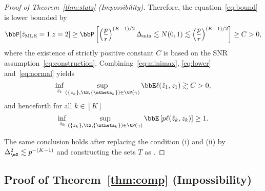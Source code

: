 \documentclass[lettersize,onecolumn,journal]{IEEEtran}
\theoremstyle{definition}
\theoremstyle{definition}
\begin{document}
\begin{proof}[Proof of Theorem~\ref{thm:stats} (Impossibility)]
Therefore, the equation~\eqref{eq:bound} is lower bounded by
\begin{equation}\label{eq:normal}
\bbP[\hat z_{\text{MLE}}=1|z=2] \geq \bbP\left[ \left({p\over r}\right)^{(K-1)/2}\Delta_{\min}\lesssim N(0,1)\lesssim  \left({p\over r}\right)^{(K-1)/2} \right]\geq C>0,
\end{equation}
 where the existence of strictly positive constant $C$ is based on the SNR assumption~\eqref{eq:construction}. Combining~\eqref{eq:minimax}, \eqref{eq:lower} and~\eqref{eq:normal} yields
\[
\inf_{\hat z_1}\sup_{(\{z_k\},\tS,\{\mtheta_k\})\in \tP(\gamma)}\bbE\ell(\hat z_1, z_1)\gtrsim C>0, 
\]
and henceforth for all $k \in [K]$
\[
\inf_{\hat z_k}\sup_{(\{z_k\},\tS,\{\mtheta_k\})\in \tP(\gamma)}\bbE \left[p\ell(\hat z_k, z_k)\right]\geq 1.
\]

{
\color{red}

The same conclusion holds after replacing the condition (i) and (ii) by  $\Delta_{\mX}^2 \lesssim p^{-(K-1)}$ and constructing the sets $T$ as \citet[Proof of Theorem 6]{han2020exact}. 

}
\end{proof}



\subsection{Proof of Theorem~\ref{thm:comp} (Impossibility)}\label{sec:compprove1}
\end{document}
